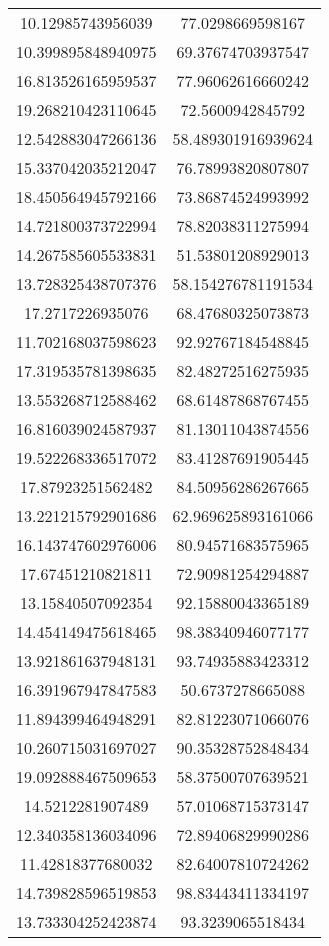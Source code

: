 \begin{table}
\begin{tabular}{cc}
10.12985743956039 & 77.0298669598167 \\
10.399895848940975 & 69.37674703937547 \\
16.813526165959537 & 77.96062616660242 \\
19.268210423110645 & 72.5600942845792 \\
12.542883047266136 & 58.489301916939624 \\
15.337042035212047 & 76.78993820807807 \\
18.450564945792166 & 73.86874524993992 \\
14.721800373722994 & 78.82038311275994 \\
14.267585605533831 & 51.53801208929013 \\
13.728325438707376 & 58.154276781191534 \\
17.2717226935076 & 68.47680325073873 \\
11.702168037598623 & 92.92767184548845 \\
17.319535781398635 & 82.48272516275935 \\
13.553268712588462 & 68.61487868767455 \\
16.816039024587937 & 81.13011043874556 \\
19.522268336517072 & 83.41287691905445 \\
17.87923251562482 & 84.50956286267665 \\
13.221215792901686 & 62.969625893161066 \\
16.143747602976006 & 80.94571683575965 \\
17.67451210821811 & 72.90981254294887 \\
13.15840507092354 & 92.15880043365189 \\
14.454149475618465 & 98.38340946077177 \\
13.921861637948131 & 93.74935883423312 \\
16.391967947847583 & 50.6737278665088 \\
11.894399464948291 & 82.81223071066076 \\
10.260715031697027 & 90.35328752848434 \\
19.092888467509653 & 58.37500707639521 \\
14.5212281907489 & 57.01068715373147 \\
12.340358136034096 & 72.89406829990286 \\
11.42818377680032 & 82.64007810724262 \\
14.739828596519853 & 98.83443411334197 \\
13.733304252423874 & 93.3239065518434 \\

\end{tabular}
\end{table}
